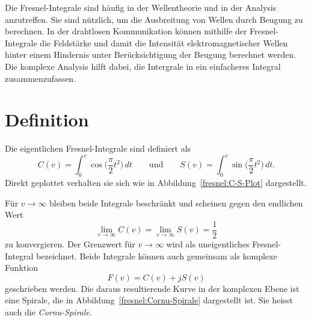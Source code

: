 %
%
%
%

\noindent
Die Fresnel-Integrale sind häufig in der Wellentheorie und in der Analysis anzutreffen. 
Sie sind nützlich, um die Ausbreitung von Wellen durch Beugung zu berechnen. 
In der drahtlosen Kommunikation können mithilfe der Fresnel-Integrale die Feldstärke 
%
%
und damit die Intensität elektromagnetischer Wellen hinter einem Hindernis 
%
unter Berücksichtigung der Beugung berechnet werden. 
%
Die komplexe Analysis hilft dabei, die Intergrale in ein einfacheres Integral zusammenzufassen. 

\section{Definition}

Die eigentlichen Fresnel-Integrale sind definiert als 
%
\begin{equation}
    C(v) 
    = 
    \int_{0}^{v} \cos \biggl(\frac{\pi}{2}t^2\biggr) \,dt
    \qquad \text{und} \qquad
    S(v) 
    = 
    \int_{0}^{v} \sin \biggl(\frac{\pi}{2}t^2\biggr) \,dt.
    \label{fresnel:integral-C-S}
\end{equation}
Direkt geplottet verhalten sie sich wie in Abbildung~\ref{fresnel:C-S-Plot}
dargestellt.

Für $v\to\infty$ bleiben beide Integrale beschränkt und scheinen gegen den endlichen Wert
\begin{equation}
    \lim\limits_{v \to \infty} C(v)
    =
    \lim\limits_{v \to \infty} S(v)
    =
    \frac{1}{2} 
\end{equation}
zu konvergieren.
Der Grenzwert für $v\to\infty$ wird als uneigentliches Fresnel-Integral
bezeichnet.
%
Beide Integrale können auch gemeinsam als komplexe Funktion 
\begin{equation}
    F(v)=C(v) + jS(v)
    \label{fresnel: Komplexe Funktion}
\end{equation}
geschrieben werden.
Die daraus resultierende Kurve in der komplexen Ebene ist eine Spirale,
die in Abbildung~\ref{fresnel:Cornu-Spirale} dargestellt ist. Sie heisst
auch die \emph{Cornu-Spirale}.
%



